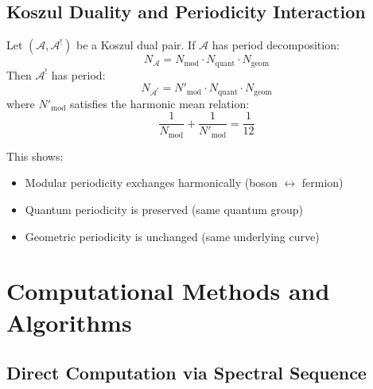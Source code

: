 \subsection{Koszul Duality and Periodicity Interaction}

\begin{theorem}
Let $(\mathcal{A}, \mathcal{A}^!)$ be a Koszul dual pair. If $\mathcal{A}$ has period decomposition:
\[
N_{\mathcal{A}} = N_{\text{mod}} \cdot N_{\text{quant}} \cdot N_{\text{geom}}
\]
Then $\mathcal{A}^!$ has period:
\[
N_{\mathcal{A}^!} = N'_{\text{mod}} \cdot N_{\text{quant}} \cdot N_{\text{geom}}
\]
where $N'_{\text{mod}}$ satisfies the harmonic mean relation:
\[
\frac{1}{N_{\text{mod}}} + \frac{1}{N'_{\text{mod}}} = \frac{1}{12}
\]
\end{theorem}

This shows:
\begin{itemize}
\item Modular periodicity exchanges harmonically (boson $\leftrightarrow$ fermion)
\item Quantum periodicity is preserved (same quantum group)
\item Geometric periodicity is unchanged (same underlying curve)
\end{itemize}

\section{Computational Methods and Algorithms}

\subsection{Direct Computation via Spectral Sequence}

